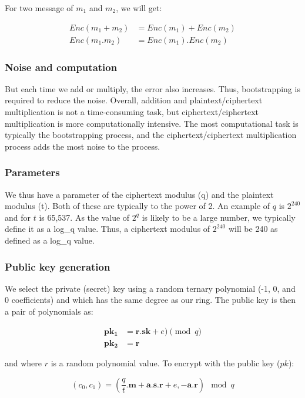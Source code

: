 \documentclass[envcountsame,runningheads,notitlepage]{llncs}
\begin{document}
For two message of $m_1$ and $m_2$, we will get:

\begin{align}
Enc(m_1+m_2) &= Enc(m_1) + Enc(m_2)\\
Enc(m_1.m_2) &= Enc(m_1) . Enc(m_2)
\end{align}


\subsubsection{Noise and computation}
But each time we add or multiply, the error also increases. Thus, bootstrapping is required to reduce the noise. Overall, addition and plaintext/ciphertext multiplication is not a time-consuming task, but ciphertext/ciphertext multiplication is more computationally intensive. The most computational task is typically the bootstrapping process, and the ciphertext/ciphertext multiplication process adds the most noise to the process.

\subsubsection{Parameters}
We thus have a parameter of the ciphertext modulus (q) and the plaintext modulus (t). Both of these are typically to the power of 2. An example of $q$ is $2^{240}$ and for $t$ is 65,537. As the value of $2^q$ is likely to be a large number, we typically define it as a log\_q value.  Thus, a ciphertext modulus of $2^{240}$ will be 240 as defined as a log\_q value.

\subsubsection{Public key generation}
We select the private (secret) key using a random ternary polynomial (-1, 0, and 0 coefficients) and which has the same degree as our ring. The public key is then a pair of polynomials as:

\begin{align}
\mathbf{pk_1} &= \mathbf{r}.\mathbf{sk}+e) \pmod q\\
\mathbf{pk_2}  &= \mathbf{r}
\end{align}

and where $r$ is a random polynomial value. To encrypt with the public key ($pk$):

\begin{equation}
(c_0, c_1) =\left( \frac{q}{t}.\mathbf{m}  + \mathbf{a}.\mathbf{s}.\mathbf{r}  + e,\mathbf{-a}.\mathbf{r} \right) \mod q
\end{equation}
\end{document}
